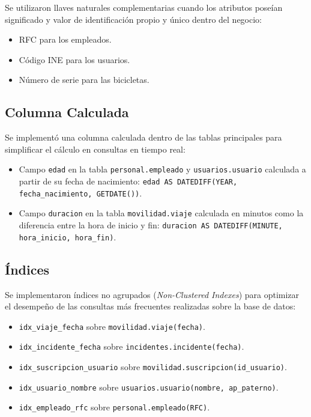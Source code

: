 Se utilizaron llaves naturales complementarias cuando los atributos poseían significado y valor de identificación propio y único dentro del negocio:
\begin{itemize}
	\item RFC para los empleados.
	\item Código INE para los usuarios.
	\item Número de serie para las bicicletas.
\end{itemize}

\subsection{Columna Calculada}

Se implementó una columna calculada dentro de las tablas principales para simplificar el cálculo en consultas en tiempo real:
\begin{itemize}
	\item Campo \texttt{edad} en la tabla \texttt{personal.empleado} y \texttt{usuarios.usuario} calculada a partir de su fecha de nacimiento: \texttt{edad AS DATEDIFF(YEAR, fecha\_nacimiento, GETDATE())}.
	\item Campo \texttt{duracion} en la tabla \texttt{movilidad.viaje} calculada en minutos como la diferencia entre la hora de inicio y fin: \texttt{duracion AS DATEDIFF(MINUTE, hora\_inicio, hora\_fin)}.
\end{itemize}

\subsection{Índices}

Se implementaron índices no agrupados (\textit{Non-Clustered Indexes}) para optimizar el desempeño de las consultas más frecuentes realizadas sobre la base de datos:
\begin{itemize}
	\item \texttt{idx\_viaje\_fecha} sobre \texttt{movilidad.viaje(fecha)}.
	\item \texttt{idx\_incidente\_fecha} sobre \texttt{incidentes.incidente(fecha)}.
	\item \texttt{idx\_suscripcion\_usuario} sobre \texttt{movilidad.suscripcion(id\_usuario)}.
	\item \texttt{idx\_usuario\_nombre} sobre \texttt{usuarios.usuario(nombre, ap\_paterno)}.
	\item \texttt{idx\_empleado\_rfc} sobre \texttt{personal.empleado(RFC)}.
\end{itemize}

